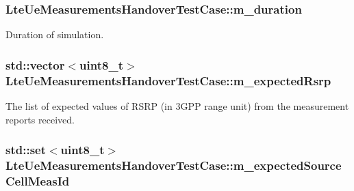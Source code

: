 \subsubsection[{\texorpdfstring{m\+\_\+duration}{m_duration}}]{ Lte\+Ue\+Measurements\+Handover\+Test\+Case\+::m\+\_\+duration\hspace{0.3cm}{\ttfamily [private]}}\hypertarget{classLteUeMeasurementsHandoverTestCase_a938131aebb85de0834fc408341950156}{}\label{classLteUeMeasurementsHandoverTestCase_a938131aebb85de0834fc408341950156}


Duration of simulation. 

\subsubsection[{\texorpdfstring{m\+\_\+expected\+Rsrp}{m_expectedRsrp}}]{\setlength{\rightskip}{0pt plus 5cm}std\+::vector$<$uint8\+\_\+t$>$ Lte\+Ue\+Measurements\+Handover\+Test\+Case\+::m\+\_\+expected\+Rsrp\hspace{0.3cm}{\ttfamily [private]}}\hypertarget{classLteUeMeasurementsHandoverTestCase_ad5e8838ca7085c4c64b0483709da1332}{}\label{classLteUeMeasurementsHandoverTestCase_ad5e8838ca7085c4c64b0483709da1332}


The list of expected values of R\+S\+RP (in 3\+G\+PP range unit) from the measurement reports received. 

\subsubsection[{\texorpdfstring{m\+\_\+expected\+Source\+Cell\+Meas\+Id}{m_expectedSourceCellMeasId}}]{\setlength{\rightskip}{0pt plus 5cm}std\+::set$<$uint8\+\_\+t$>$ Lte\+Ue\+Measurements\+Handover\+Test\+Case\+::m\+\_\+expected\+Source\+Cell\+Meas\+Id\hspace{0.3cm}{\ttfamily [private]}}\hypertarget{classLteUeMeasurementsHandoverTestCase_aca431e1ebc93460a53628630a534c474}{}\label{classLteUeMeasurementsHandoverTestCase_aca431e1ebc93460a53628630a534c474}


